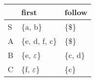 \documentclass{standalone}
\providecommand\lightrule{%
	\arrayrulecolor{black!30}%
	\midrule[\lightrulewidth]%
	\arrayrulecolor{black}}
\begin{document}
\begin{tabularx}{\textwidth}{XXX}
    & first & follow\\
    \midrule
        S
        &
        \{a, b\} %
        &
        \{\$\} %
        \\ \lightrule
        A
        &
        \{e, d, f, c\} %
        &
        \{\$\} %
        \\ \lightrule
        B
        &
        \{e, \(\varepsilon\)\} %
        &
        \{c, d\} %
        \\ \lightrule
        C
        &
        \{f, \(\varepsilon\)\} %
        &
        \{c\} %
\end{tabularx}
\end{document}
